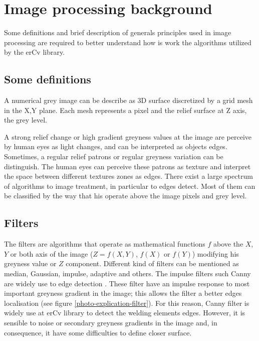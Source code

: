 \section{Image processing background}
\label{image_processing_background}

Some definitions and brief description of generals principles used in image processing are required to better understand how is work the algorithms utilized by the erCv library.

\subsection{Some definitions}
\label{some_definitions}

A numerical grey image can be describe as 3D surface discretized by a grid 
mesh in the X,Y plane. Each mesh represents a pixel and the relief surface
 at Z axis, the grey level.  

A strong relief change or high gradient greyness values at the image are
 perceive by human eyes as light changes, and can be interpreted as 
objects edges. 
Sometimes, a regular relief patrons or regular greyness variation 
can be distinguish. The human eyes can perceive these patrons as 
texture and interpret the space between different textures zones as edges.
There exist a large spectrum of algorithms to image treatment, 
in particular to edges detect. Most of them can be classified 
by the way that his operate above the image pixels and grey level.


\subsection{Filters}
\label{filters}

The filters are algorithms that operate as mathematical functions 
$f$ above the $X$, $Y$ or both axis of the image ($Z = f(X,Y)$,  
$f(X)$ or $f(Y)$)  modifying his greyness value or $Z$ component. 
Different kind of filters can be mentioned as median, Gaussian, 
impulse, adaptive and others. The impulse filters such Canny are
 widely use to edge detection \cite{COCQUEREZ}. These filter have
 an impulse response to most important greyness gradient in the 
image; this allows the filter a better edges localisation (see 
figure \ref{photo-explication-filter}). For this reason, Canny 
filter is widely use at erCv library to detect the welding 
elements edges. However, it is sensible to noise or secondary
 greyness gradients in the image and, in consequence, it have 
some difficulties to define closer surface.

